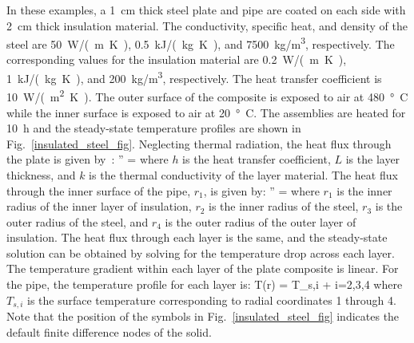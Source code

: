 \documentclass[11pt]{book}
\begin{document}
In these examples, a 1~cm thick steel plate and pipe are coated on each side with 2~cm thick insulation material. The conductivity, specific heat, and density of the steel are 50~\si{W/(m.K)}, 0.5~\si{kJ/(kg.K)}, and 7500~\si{kg/m^3}, respectively. The corresponding values for the insulation material are 0.2~\si{W/(m.K)}, 1~\si{kJ/(kg.K)}, and 200~\si{kg/m^3}, respectively. The heat transfer coefficient is 10~\si{W/(m^2.K)}. The outer surface of the composite is exposed to air at 480~\si{\degree C} while the inner surface is exposed to air at 20~\si{\degree C}. The assemblies are heated for 10~h and the steady-state temperature profiles are shown in Fig.~\ref{insulated_steel_fig}. Neglecting thermal radiation, the heat flux through the plate is given by~\cite{Incropera:1}:
\be
   '' = 
\ee
where $h$ is the heat transfer coefficient, $L$ is the layer thickness, and $k$ is the thermal conductivity of the layer material. The heat flux through the inner surface of the pipe, $r_1$, is given by:
\be
   '' = 
\ee
where $r_1$ is the inner radius of the inner layer of insulation, $r_2$ is the inner radius of the steel, $r_3$ is the outer radius of the steel, and $r_4$ is the outer radius of the outer layer of insulation. The heat flux through each layer is the same, and the steady-state solution can be obtained by solving for the temperature drop across each layer. The temperature gradient within each layer of the plate composite is linear. For the pipe, the temperature profile for each layer is:
\be
   T(r) = T_{s,i} +  \ln {} \quad \quad i=2,3,4
\ee
where $T_{s,i}$ is the surface temperature corresponding to radial coordinates 1 through 4. Note that the position of the symbols in Fig.~\ref{insulated_steel_fig} indicates the default finite difference nodes of the solid.
\end{document}
